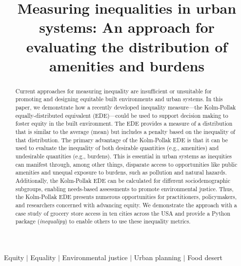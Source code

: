 \documentclass[final,3p,times,onecolumn,sort&compress]{elsarticle}
\begin{document}
\begin{frontmatter}

\title{Measuring inequalities in urban systems: An approach for evaluating the distribution of amenities and burdens}



\begin{abstract}
Current approaches for measuring inequality are insufficient or unsuitable for promoting and designing equitable built environments and urban systems.
In this paper, we demonstrate how a recently developed inequality measure---the Kolm-Pollak equally-distributed equivalent (EDE)---could be used to support decision making to foster equity in the built environment.
The EDE provides a measure of a distribution that is similar to the average (mean) but includes a penalty based on the inequality of that distribution.
The primary advantage of the Kolm-Pollak EDE is that it can be used to evaluate the inequality of both desirable quantities (e.g., amenities) and undesirable quantities (e.g., burdens).
This is essential in urban systems as inequities can manifest through, among other things, disparate access to opportunities like public amenities and unequal exposure to burdens, such as pollution and natural hazards.
Additionally, the Kolm-Pollak EDE can be calculated for different sociodemographic subgroups, enabling needs-based assessments to promote environmental justice.
Thus, the Kolm-Pollak EDE presents numerous opportunities for practitioners, policymakers, and researchers concerned with advancing equity.
We demonstrate the approach with a case study of grocery store access in ten cities across the USA and provide a Python package (\textit{inequalipy}) to enable others to use these inequality metrics.
\end{abstract}

\begin{keyword}
Equity $|$ Equality $|$ Environmental justice $|$ Urban planning $|$ Food desert 
\end{keyword}

\end{frontmatter}
\end{document}
